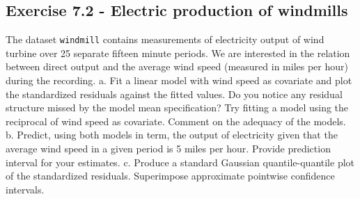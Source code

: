 \documentclass[]{book}
\theoremstyle{definition}
\theoremstyle{definition}
\theoremstyle{definition}
\theoremstyle{remark}
\begin{document}
\hypertarget{exercise-7.2---electric-production-of-windmills}{%
\subsection{Exercise 7.2 - Electric production of
windmills}\label{exercise-7.2---electric-production-of-windmills}}

The dataset \texttt{windmill} contains measurements of electricity
output of wind turbine over 25 separate fifteen minute periods. We are
interested in the relation between direct output and the average wind
speed (measured in miles per hour) during the recording. a. Fit a linear
model with wind speed as covariate and plot the standardized residuals
against the fitted values. Do you notice any residual structure missed
by the model mean specification? Try fitting a model using the
reciprocal of wind speed as covariate. Comment on the adequacy of the
models. b. Predict, using both models in term, the output of electricity
given that the average wind speed in a given period is 5 miles per hour.
Provide prediction interval for your estimates. c. Produce a standard
Gaussian quantile-quantile plot of the standardized residuals.
Superimpose approximate pointwise confidence intervals.
\end{document}
